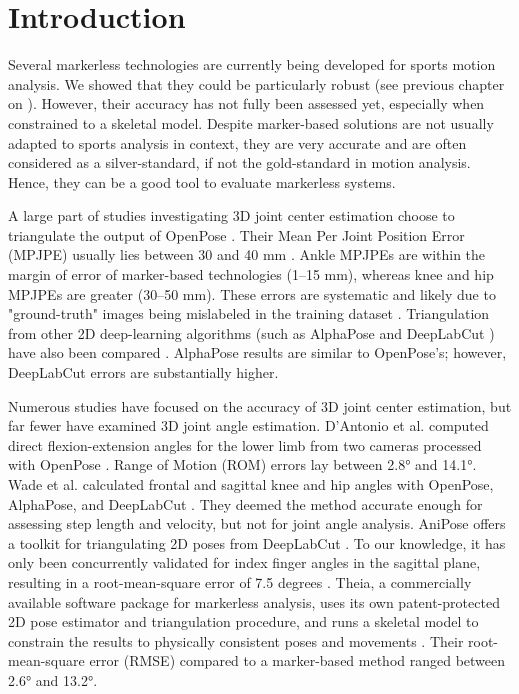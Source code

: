 \newpage


\section{Introduction}

Several markerless technologies are currently being developed for sports motion analysis. We showed that they could be particularly robust (see previous chapter on  \cite{Pagnon2021}). However, their accuracy has not fully been assessed yet, especially when constrained to a skeletal model. Despite marker-based solutions are not usually adapted to sports analysis in context, they are very accurate and are often considered as a silver-standard, if not the gold-standard in motion analysis. Hence, they can be a good tool to evaluate markerless systems.

A large part of studies investigating 3D joint center estimation choose to triangulate the output of OpenPose \cite{Cao2019}. Their Mean Per Joint Position Error (MPJPE) usually lies between 30 and 40 mm \cite{Nakano2019,Slembrouck2020,Labuguen2020}. Ankle MPJPEs are within the margin of error of marker-based technologies (1–15 mm), whereas knee and hip MPJPEs are greater (30–50 mm). These errors are systematic and likely due to "ground-truth" images being mislabeled in the training dataset \cite{Needham2021b}. Triangulation from other 2D deep-learning algorithms (such as AlphaPose \cite{Fang2017} and DeepLabCut \cite{Mathis2018}) have also been compared \cite{Needham2021b}. AlphaPose results are similar to OpenPose’s; however, DeepLabCut errors are substantially higher.

Numerous studies have focused on the accuracy of 3D joint center estimation, but far fewer have examined 3D joint angle estimation. D’Antonio et al. computed direct flexion-extension angles for the lower limb from two cameras processed with OpenPose \cite{D'Antonio2021}. Range of Motion (ROM) errors lay between 2.8° and 14.1°. Wade et al. calculated frontal and sagittal knee and hip angles with OpenPose, AlphaPose, and DeepLabCut \cite{Wade2021}. They deemed the method accurate enough for assessing step length and velocity, but not for joint angle analysis. AniPose offers a toolkit for triangulating 2D poses from DeepLabCut \cite{Karashchuk2021}. To our knowledge, it has only been concurrently validated for index finger angles in the sagittal plane, resulting in a root-mean-square error of 7.5 degrees \cite{Geelen2021}. Theia, a commercially available software package for markerless analysis, uses its own patent-protected 2D pose estimator and triangulation procedure, and runs a skeletal model to constrain the results to physically consistent poses and movements \cite{Kanko2021b}. Their root-mean-square error (RMSE) compared to a marker-based method ranged between 2.6° and 13.2°.

